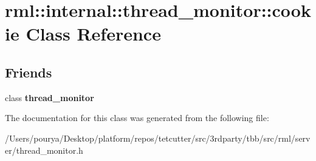 \hypertarget{classrml_1_1internal_1_1thread__monitor_1_1cookie}{}\section{rml\+:\+:internal\+:\+:thread\+\_\+monitor\+:\+:cookie Class Reference}
\label{classrml_1_1internal_1_1thread__monitor_1_1cookie}
\subsection*{Friends}
\begin{DoxyCompactItemize}
\item 
\hypertarget{classrml_1_1internal_1_1thread__monitor_1_1cookie_ac2e0fbd8f6481c16578e40bb0f398c7f}{}class {\bfseries thread\+\_\+monitor}\label{classrml_1_1internal_1_1thread__monitor_1_1cookie_ac2e0fbd8f6481c16578e40bb0f398c7f}

\end{DoxyCompactItemize}


The documentation for this class was generated from the following file\+:\begin{DoxyCompactItemize}
\item 
/\+Users/pourya/\+Desktop/platform/repos/tetcutter/src/3rdparty/tbb/src/rml/server/thread\+\_\+monitor.\+h\end{DoxyCompactItemize}
